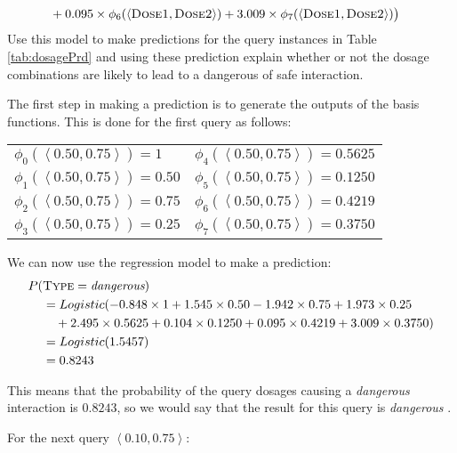 \documentclass[solution]{ditpaper}
\begin{document}
\begin{enumerate}
\begin{alignat*}{2}
  & + 0.095 \times\phi_6(\mathbf{\left<\textsc{Dose1}, \textsc{Dose2}\right>})
  + 3.009\times\phi_7(\mathbf{\left<\textsc{Dose1}, \textsc{Dose2}\right>})\big) 
\end{alignat*}
Use this model to make predictions for the query instances in Table \ref{tab:dosagePrd} and using these prediction explain whether or not the dosage combinations are likely to lead to a dangerous of safe interaction.
		\begin{answer}
	The first step in making a prediction is to generate the outputs of the basis functions. This is done for the first query as follows:
			\begin{center}
\begin{tabular}[ht]{ l  l  }
$\phi_0(\left<0.50, 0.75\right>) =  1$ & $\phi_4(\left<0.50, 0.75\right>) = 0.5625$ \\
$\phi_1(\left<0.50, 0.75\right>) = 0.50$ & $\phi_5(\left<0.50, 0.75\right>) = 0.1250$ \\
$\phi_2(\left<0.50, 0.75\right>) = 0.75$ &$\phi_6(\left<0.50, 0.75\right>) = 0.4219$  \\
$\phi_3(\left<0.50, 0.75\right>) = 0.25$ & $\phi_7(\left<0.50, 0.75\right>) = 0.3750$ \\
\end{tabular}
\end{center}
	We can now use the regression model to make a prediction:
		\begin{alignat*}{2}				
P(&\textsc{Type}=\textit{dangerous}) \\
& = Logistic(-0.848\times 1 + 1.545 \times0.50 -1.942 \times0.75 + 1.973 \times0.25 \\
& ~~~ +  2.495   \times 0.5625 + 0.104 \times 0.1250 + 0.095 \times 0.4219 + 3.009\times0.3750) \\
 & = Logistic(1.5457)  \\
 & = 0.8243 
\end{alignat*}

\noindent This means that the probability of the query dosages causing a \textit{dangerous} interaction is $0.8243$, so we would say that the result for this query is  \textit{dangerous} . 

For the next query $\left<0.10	,0.75\right>$:


\end{answer}
\end{enumerate}
\end{document}
